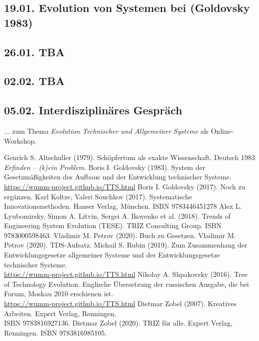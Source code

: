 \documentclass[11pt,a4paper]{article}
\begin{document}
\subsection*{19.01. Evolution von Systemen bei (Goldovsky 1983)}

\cite{Goldovsky1983}

\subsection*{26.01. TBA}

\subsection*{02.02. TBA}

\subsection*{05.02. Interdisziplinäres Gespräch}

... zum Thema \emph{Evolution Technischer und Allgemeiner Systeme} als
Online-Workshop.

\begin{thebibliography}{xxx}
 Genrich S. Altschuller (1979).  Schöpfertum als
  exakte Wissenschaft.  Deutsch 1983 \emph{Erfinden -- (k)ein Problem}.
 Boris I. Goldovsky (1983). System der
  Gesetzmäßigkeiten des Aufbaus und der Entwicklung technischer Systeme.
  \url{https://wumm-project.github.io/TTS.html}
 Boris I. Goldovsky (2017). Noch zu ergänzen. 
 Karl Koltze, Valeri Souchkov (2017).
  Systematische Innovationsmethoden.  Hanser Verlag, München. ISBN
  9783446451278
 Alex L. Lyubomirsky, Simon A. Litvin, Sergei A. Ikovenko et
  al. (2018). Trends of Engineering System Evolution (TESE).  TRIZ Consulting
  Group. ISBN 9783000598463.
 Vladimir M. Petrov (2020). Buch zu Gesetzen.
 Vladimir M. Petrov (2020). TDS-Aufsatz.
 Michail S. Rubin (2019). Zum Zusammenhang der
  Entwicklungsgesetze allgemeiner Systeme und der Entwicklungsgesetze
  technischer Systeme. \\ \url{https://wumm-project.github.io/TTS.html}
 Nikolay A. Shpakovsky (2016). Tree of Technology
  Evolution. Englische Übersetzung der russischen Ausgabe, die bei Forum,
  Moskau 2010 erschienen ist.\\ \url{https://wumm-project.github.io/TTS.html}
 Dietmar Zobel (2007). Kreatives Arbeiten. Expert Verlag,
  Renningen.\\ ISBN 9783816927136.
 Dietmar Zobel (2020). TRIZ für alle. Expert Verlag,
  Renningen. ISBN 9783816985105.
\end{thebibliography}
\end{document}
